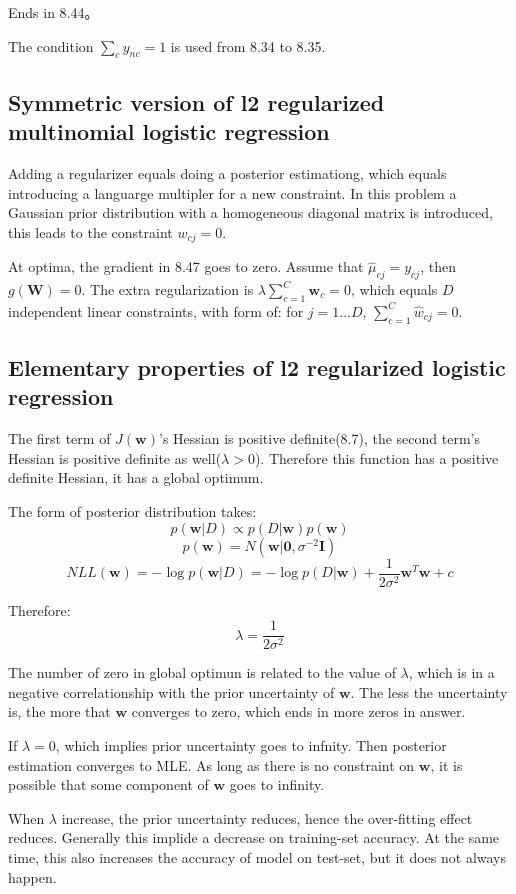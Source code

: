 \documentclass[UTF8]{ctexart}
\begin{document}
Ends in 8.44。

The condition $\sum_{c}y_{nc}=1$ is used from 8.34 to 8.35.

\subsection{Symmetric version of l2 regularized multinomial logistic regression}
Adding a regularizer equals doing a posterior estimationg, which equals introducing a languarge multipler for a new constraint. In this problem a Gaussian prior distribution with a homogeneous diagonal matrix is introduced, this leads to the constraint $w_{cj}=0$.

At optima, the gradient in 8.47 goes to zero. Assume that $\hat{\mu}_{cj}=y_{cj}$, then $g(\textbf{W})=0$. The extra regularization is $\lambda\sum_{c=1}^{C}\textbf{w}_{c}=0$, which equals $D$ independent linear constraints, with form of: for $j=1...D$, $\sum_{c=1}^{C}\hat{w}_{cj}=0$.

\subsection{Elementary properties of l2 regularized logistic regression}
The first term of $J(\textbf{w})$'s Hessian is positive definite(8.7), the second term's Hessian is positive definite as well($\lambda > 0$). Therefore this function has a positive definite Hessian, it has a global optimum.

The form of posterior distribution takes:
$$p(\textbf{w}|D)\propto p(D|\textbf{w})p(\textbf{w})$$
$$p(\textbf{w})=N(\textbf{w}|\textbf{0},\sigma^{-2}\textbf{I})$$
$$NLL(\textbf{w})=-\log p(\textbf{w}|D) = -\log p(D|\textbf{w}) + \frac{1}{2\sigma^{2}}\textbf{w}^{T}\textbf{w}+c$$

Therefore:
$$\lambda=\frac{1}{2\sigma^{2}}$$

The number of zero in global optimun is related to the value of $\lambda$, which is in a negative correlationship with the prior uncertainty of $\textbf{w}$. The less the uncertainty is, the more that $\textbf{w}$ converges to zero, which ends in more zeros in answer.

If $\lambda=0$, which implies prior uncertainty goes to infnity. Then posterior estimation converges to MLE. As long as there is no constraint on $\textbf{w}$, it is possible that some component of $\textbf{w}$ goes to infinity.

When $\lambda$ increase, the prior uncertainty reduces, hence the over-fitting effect reduces. Generally this implide a decrease on training-set accuracy. At the same time, this also increases the accuracy of model on test-set, but it does not always happen.
\end{document}
